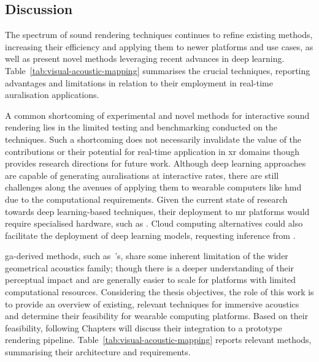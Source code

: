 \subsection{Discussion}\label{sec:sound-rendering-advances-discussion}
The spectrum of sound rendering techniques continues to refine existing methods, increasing their efficiency and applying them to newer platforms and use cases, as well as present novel methods leveraging recent advances in deep learning. Table~\ref{tab:visual-acoustic-mapping} summarises the crucial techniques, reporting advantages and limitations in relation to their employment in real-time auralisation applications.\par
A common shortcoming of experimental and novel methods for interactive sound rendering lies in the limited testing and benchmarking conducted on the techniques. Such a shortcoming does not necessarily invalidate the value of the contributions or their potential for real-time application in \acrshort{xr} domains though provides research directions for future work. Although deep learning approaches are capable of generating auralisations at interactive rates, there are still challenges along the avenues of applying them to wearable computers like \acrshort{hmd} due to the computational requirements. Given the current state of research towards deep learning-based techniques, their deployment to \acrshort{mr} platforms would require specialised hardware, such as . Cloud computing alternatives could also facilitate the deployment of deep learning models, requesting inference from .\par
\acrshort{ga}-derived methods, such as~\cite{schissler2016interactive,saviojaGA,schroder2011physically}'s, share some inherent limitation of the wider geometrical acoustics family; though there is a deeper understanding of their perceptual impact and are generally easier to scale for platforms with limited computational resources.
Considering the thesis objectives, the role of this work is to provide an overview of existing, relevant techniques for immersive acoustics and determine their feasibility for wearable computing platforms. Based on their feasibility, following Chapters will discuss their integration to a prototype rendering pipeline. Table~\ref{tab:visual-acoustic-mapping} reports relevant methods, summarising their architecture and requirements.



